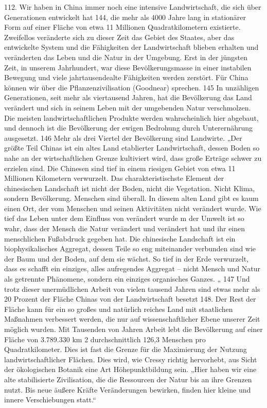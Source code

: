 \documentclass[11pt,a4paper]{book}
\begin{document}
112. Wir haben in China immer noch eine intensive Landwirtschaft, die sich über Generationen entwickelt hat 144, die mehr als 4000 Jahre lang in stationärer Form auf einer Fläche von etwa 11 Millionen Quadratkilometern existierte. Zweifellos veränderte sich zu dieser Zeit das Gebiet des Staates, aber das entwickelte System und die Fähigkeiten der Landwirtschaft blieben erhalten und veränderten das Leben und die Natur in der Umgebung. Erst in der jüngsten Zeit, in unserem Jahrhundert, war diese Bevölkerungsmasse in einer instabilen Bewegung und viele jahrtausendealte Fähigkeiten werden zerstört. Für China können wir über die Pflanzenzivilisation (Goodnear) sprechen. 145 In unzähligen Generationen, seit mehr als viertausend Jahren, hat die Bevölkerung das Land verändert und sich in seinem Leben mit der umgebenden Natur verschmolzen. Die meisten landwirtschaftlichen Produkte werden wahrscheinlich hier abgebaut, und dennoch ist die Bevölkerung der ewigen Bedrohung durch Unterernährung ausgesetzt. 146 Mehr als drei Viertel der Bevölkerung sind Landwirte. „Der größte Teil Chinas ist ein altes Land etablierter Landwirtschaft, dessen Boden so nahe an der wirtschaftlichen Grenze kultiviert wird, dass große Erträge schwer zu erzielen sind. Die Chinesen sind tief in einem riesigen Gebiet von etwa 11 Millionen Kilometern verwurzelt. Das charakteristischste Element der chinesischen Landschaft ist nicht der Boden, nicht die Vegetation. Nicht Klima, sondern Bevölkerung. Menschen sind überall. In diesem alten Land gibt es kaum einen Ort, der vom Menschen und seinen Aktivitäten nicht verändert wurde. Wie tief das Leben unter dem Einfluss von verändert wurde m der Umwelt ist so wahr, dass der Mensch die Natur verändert und verändert hat und ihr einen menschlichen Fußabdruck gegeben hat. Die chinesische Landschaft ist ein biophysikalisches Aggregat, dessen Teile so eng miteinander verbunden sind wie der Baum und der Boden, auf dem sie wächst. So tief in der Erde verwurzelt, dass es schafft ein einziges, alles aufregendes Aggregat -- nicht Mensch und Natur als getrennte Phänomene, sondern ein einziges organisches Ganzes. „ 147 Und trotz dieser unermüdlichen Arbeit von vielen tausend Jahren sind etwas mehr als 20 Prozent der Fläche Chinas von der Landwirtschaft besetzt 148. Der Rest der Fläche kann für ein so großes und natürlich reiches Land mit staatlichen Maßnahmen verbessert werden, die nur auf wissenschaftlicher Ebene unserer Zeit möglich wurden. Mit Tausenden von Jahren Arbeit lebt die Bevölkerung auf einer Fläche von 3.789.330 km 2 durchschnittlich 126,3 Menschen pro Quadratkilometer. Dies ist fast die Grenze für die Maximierung der Nutzung landwirtschaftlicher Flächen. Dies wird, wie Cressy richtig hervorhebt, aus Sicht der ökologischen Botanik eine Art Höhepunktbildung sein. „Hier haben wir eine alte stabilisierte Zivilisation, die die Ressourcen der Natur bis an ihre Grenzen nutzt. Bis neue äußere Kräfte Veränderungen bewirken, finden hier kleine und innere Verschiebungen statt.“
\end{document}
